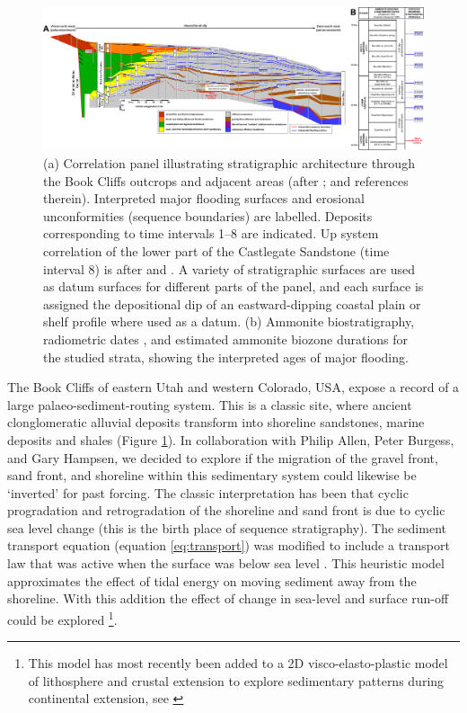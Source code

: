 \begin{figure}
\includegraphics[width=\textwidth]{./figures/ch2-bookcliffs.pdf}
\caption{(a) Correlation panel illustrating stratigraphic architecture through the Book Cliffs outcrops and adjacent areas (after \citealp{horton-etal-2004,hampson-2010,hampson-etal-2014}; and references therein). Interpreted major flooding surfaces and erosional unconformities (sequence boundaries) are labelled. Deposits corresponding to time intervals 1--8 are indicated. Up system correlation of the lower part of the Castlegate Sandstone (time interval 8) is after \cite{robinson-1998} and \cite{mclaurin-2000}. A variety of stratigraphic surfaces are used as datum surfaces for different parts of the panel, and each surface is assigned the depositional dip of an eastward-dipping coastal plain or shelf profile where used as a datum. (b) Ammonite biostratigraphy, radiometric dates \citep{obradovich-1993}, and estimated ammonite biozone durations \citep{krystinik-1995} for the studied strata, showing the interpreted ages of major flooding.}
\label{fg:bookcliffs}
\end{figure}

The Book Cliffs of eastern Utah and western Colorado, USA, expose a record of a large palaeo-sediment-routing system. This is a classic site, where ancient clonglomeratic alluvial deposits transform into shoreline sandstones, marine deposits and shales (Figure \ref{fg:bookcliffs}). In collaboration with Philip Allen, Peter Burgess, and Gary Hampsen, we decided to explore if the migration of the gravel front, sand front, and shoreline within this sedimentary system could likewise be `inverted' for past forcing. The classic interpretation has been that cyclic progradation and retrogradation of the shoreline and sand front is due to cyclic sea level change (this is the birth place of sequence stratigraphy). The sediment transport equation (equation \ref{eq:transport}) was modified to include a transport law that was active when the surface was below sea level \citep{kaufman-etal-1991,armitage-etal-br-2018}. This heuristic model approximates the effect of tidal energy on moving sediment away from the shoreline. With this addition the effect of change in sea-level and surface run-off could be explored \footnote{This model has most recently been added to a 2D visco-elasto-plastic model of lithosphere and crustal extension to explore sedimentary patterns during continental extension, see \cite{perez-gussinye-etal-2020}}.

